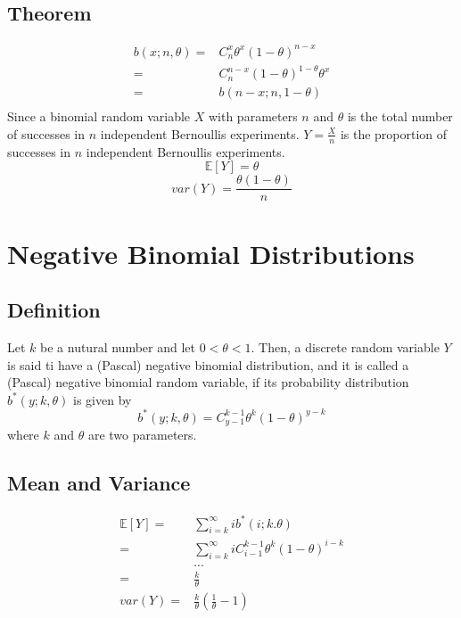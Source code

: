 \documentclass[titlepage]{article}
\begin{document}
        \subsection*{Theorem}
                    \begin{equation*}
                        \begin{split}
                            b(x;n,\theta)=&C_n^x\theta^x(1-\theta)^{n-x}\\
                                =&C_n^{n-x}(1-\theta)^{1-\theta}\theta^x\\
                                =&b(n-x;n,1-\theta)\\
                        \end{split}
                    \end{equation*}
                    Since a binomial random variable $X$ with parameters $n$ and $\theta$ is the total number of successes in $n$ independent Bernoullis experiments. $Y=\frac{X}{n}$ is the proportion of successes in $n$ independent Bernoullis experiments.
                    $$\mathbb{E}[Y]=\theta$$
                    $$var(Y)=\frac{\theta(1-\theta)}{n}$$
                

    \section{Negative Binomial Distributions}
        \subsection*{Definition}
                Let $k$ be a nutural number and let $0<\theta<1$. Then, a discrete random variable $Y$ is said ti have a (Pascal) negative binomial distribution, and it is called a (Pascal) negative binomial random variable, if its probability distribution $b^*(y;k,\theta)$ is given by
                $$b^*(y;k,\theta)=C_{y-1}^{k-1}\theta^k(1-\theta)^{y-k}$$
                where $k$ and $\theta$ are two parameters.

        \subsection*{Mean and Variance}
            \begin{equation*}
                \begin{split}
                    \mathbb{E}[Y]=&\sum_{i=k}^\infty ib^*(i;k.\theta)\\
                        =&\sum_{i=k}^\infty iC_{i-1}^{k-1}\theta^k(1-\theta)^{i-k}\\
                        &...\\
                        =&\frac{k}{\theta}\\
                    var(Y)=&\frac{k}{\theta}(\frac{1}{\theta}-1)
                \end{split}
            \end{equation*}
\end{document}
